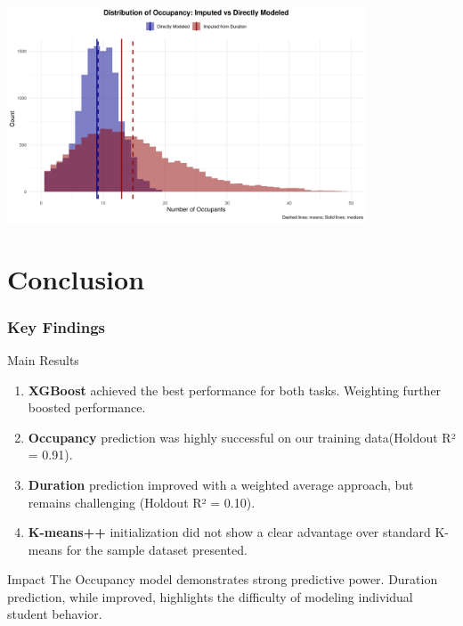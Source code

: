 \documentclass{beamer}
\begin{document}
\begin{frame}
\begin{center}
        \includegraphics[width=0.8\textwidth, height=0.45\textheight]{images/eval/imputed_vs_direct_occupancy.png}

    \end{center}
\end{frame}

\section{Conclusion}

\begin{frame}
\frametitle{Key Findings}
    \begin{block}{Main Results}
        \begin{enumerate}
            \item \textbf{XGBoost} achieved the best performance for both tasks. Weighting further boosted performance.
            \item \textbf{Occupancy} prediction was highly successful on our training data(Holdout R² = 0.91).
            \item \textbf{Duration} prediction improved with a weighted average approach, but remains challenging (Holdout R² = 0.10).
            \item \textbf{K-means++} initialization did not show a clear advantage over standard K-means for the sample dataset presented.
        \end{enumerate}
    \end{block}
                            
    \begin{alertblock}{Impact}
        The Occupancy model demonstrates strong predictive power. Duration prediction, while improved, highlights the difficulty of modeling individual student behavior.
    \end{alertblock}
\end{frame}
\end{document}
